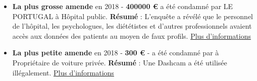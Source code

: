 \documentclass[french]{article}
\begin{document}
\newpage
\justify
	\begin{multicols}{2}
	\begin{itemize}
		\item \textbf{La plus grosse amende} en 2018 - \textbf{400000 €} a été condamné par LE PORTUGAL à Hôpital public.
		\newline
		\textbf{Résumé} : L’enquête a révélé que le personnel de l’hôpital, les psychologues, les diététistes et d’autres professionnels avaient accès aux données des patients au moyen de faux profils.
		\newline
		\href{https://www.cnpd.pt/bin/decisoes/Delib/20_984_2018.pdf}{Plus d'informations}
		\vspace{1cm}
	
		\item \textbf{La plus petite amende} en 2018 - \textbf{300 €} -  a été condamné par  à Propriétaire de voiture privée.
		\newline
		\textbf{Résumé} : Une Dashcam a été utilisée illégalement.
		\newline
		\href{https://www.ris.bka.gv.at/Dokumente/Dsk/DSBT_20180927_DSB_D550_084_0002_DSB_2018_00/DSBT_20180927_DSB_D550_084_0002_DSB_2018_00.pdf}{Plus d'informations}
	\end{itemize}
	\end{multicols}


\newpage
\end{document}
